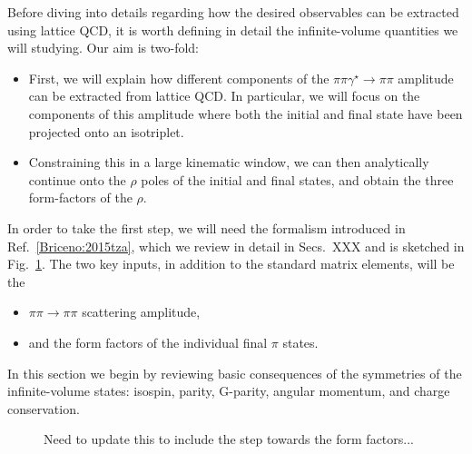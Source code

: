 Before diving into details regarding how the desired observables can be extracted using lattice QCD, it is worth defining in detail the infinite-volume quantities we will studying. Our aim is two-fold:
	\begin{itemize}
	\item First, we will explain how different components of the $\pi\pi\gamma^\star\to\pi\pi$ amplitude can be extracted from lattice QCD. In particular, we will focus on the components of this amplitude where both the initial and final state have been projected onto an isotriplet. 
	\item Constraining this in a large kinematic window, we can then analytically continue onto the $\rho$ poles of the initial and final states, and obtain the three form-factors of the $\rho$. 
	\end{itemize}

	In order to take the first step, we will need the formalism introduced in Ref.~\ref{Briceno:2015tza}, which we review in detail in {\raul Secs.~{XXX}} and is sketched in Fig.~\ref{fig:flowchart}. The two key inputs, in addition to the standard matrix elements, will be the 
	\begin{itemize}
	\item $\pi\pi\to\pi\pi$ scattering amplitude,
	\item and the form factors of the individual final $\pi$ states.
	\end{itemize}
	
	In this section we begin by reviewing basic consequences of the symmetries of the infinite-volume states: isospin, parity, G-parity, angular momentum, and charge conservation. 
	
\begin{figure}[t]
\begin{center}
\caption{ {\raul Need to update this to include the step towards the form factors...}}\label{fig:flowchart}
\end{center}
\end{figure}

